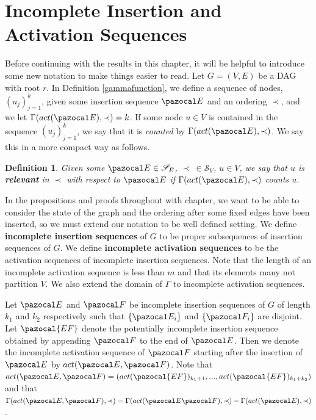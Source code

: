 \documentclass{report}
\newtheorem{definition}[theorem]{Definition}
\begin{document}
\section{Incomplete Insertion and Activation Sequences}

Before continuing with the results in this chapter, it will be helpful to introduce some new notation to make things easier to read. Let $G=(V,E)$ be a DAG with root $r$. In Definition \ref{gammafunction}, we define a sequence of nodes, $(u_j)_{j=1}^k$, given some insertion sequence $\pazocal E$ and an ordering $\prec$, and we let $\Gamma(act(\pazocal E), \prec) = k$. If some node $u \in V$ is contained in the sequence $(u_j)_{j=1}^k$, we say that it is \textit{counted} by $\Gamma(act(\pazocal E), \prec)$. We say this in a more compact way as follows.

\begin{definition}
Given some $\pazocal E \in \mathcal S_E$, $\prec \: \in \mathcal S_V$, $u \in V$, we say that $u$ is \textbf{relevant} in $\prec$ with respect to $\pazocal E$ if $\Gamma(act(\pazocal E), \prec)$ counts $u$.
\end{definition}

In the propositions and proofs throughout with chapter, we want to be able to consider the state of the graph and the ordering after some fixed edges have been inserted, so we must extend our notation to be well defined setting. We define \textbf{incomplete insertion sequences} of $G$ to be proper subsequences of insertion sequences of $G$. We define \textbf{incomplete activation sequences} to be the activation sequences of incomplete insertion sequences. Note that the length of an incomplete activation sequence is less than $m$ and that its elements many not partition $V$. We also extend the domain of $\Gamma$ to incomplete activation sequences.

Let $\pazocal E$ and $\pazocal F$ be incomplete insertion sequences of $G$ of length $k_1$ and $k_2$ respectively such that $\{\pazocal E_i\}$ and $\{\pazocal F_i\}$ are disjoint. Let $\pazocal{EF}$ denote the potentially incomplete insertion sequence obtained by appending $\pazocal F$ to the end of $\pazocal E$. Then we denote the incomplete activation sequence of $\pazocal F$ starting after the insertion of $\pazocal E$ by $act(\pazocal E, \pazocal F)$. Note that $act(\pazocal E, \pazocal F) = (act(\pazocal{EF})_{k_1 + 1},...,act(\pazocal{EF})_{k_1 + k_2})$ and that $\Gamma(act(\pazocal E, \pazocal F), \prec) = \Gamma(act(\pazocal E\pazocal F), \prec) - \Gamma(act(\pazocal E), \prec)$.
\end{document}
